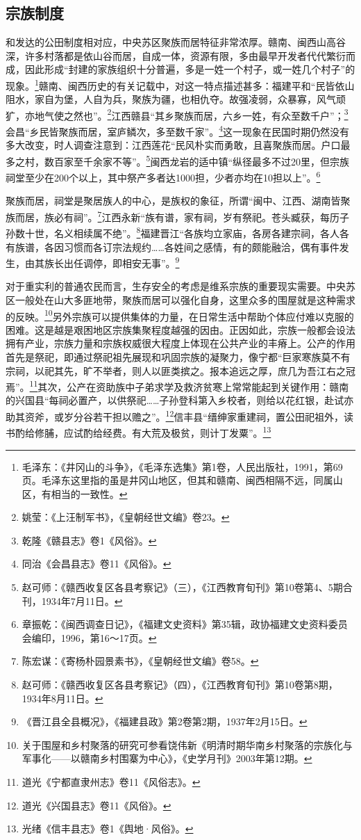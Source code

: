 \subsection{宗族制度}


和发达的公田制度相对应，中央苏区聚族而居特征非常浓厚。赣南、闽西山高谷深，许多村落都是依山谷而居，自成一体，资源有限，多由最早开发者代代繁衍而成，因此形成“封建的家族组织十分普遍，多是一姓一个村子，或一姓几个村子”的现象。\footnote{毛泽东：《井冈山的斗争》，《毛泽东选集》第1卷，人民出版社，1991，第69页。毛泽东这里指的虽是井冈山地区，但其和赣南、闽西相隔不远，同属山区，有相当的一致性。}赣南、闽西历史的有关记载中，对这一特点描述甚多：福建平和“民皆依山阻水，家自为堡，人自为兵，聚族为疆，也相仇夺。故强凌弱，众暴寡，风气顽犷，亦地气使之然也”。\footnote{姚莹：《上汪制军书》，《皇朝经世文编》卷23。}江西赣县“其乡聚族而居，六乡一姓，有众至数千户”；\footnote{乾隆《赣县志》卷1《风俗》。}会昌“乡民皆聚族而居，室庐鳞次，多至数千家”。\footnote{同治《会昌县志》卷11《风俗》。}这一现象在民国时期仍然没有多大改变，时人调查注意到：江西莲花“民风朴实而勇敢，且喜聚族而居。户口最多之村，数百家至千余家不等”。\footnote{赵可师：《赣西收复区各县考察记》（三），《江西教育旬刊》第10卷第4、5期合刊，1934年7月11日。}闽西龙岩的适中镇“纵径最多不过20里，但宗族祠堂至少在200个以上，其中祭产多者达1000担，少者亦均在10担以上”。\footnote{章振乾：《闽西调查日记》，《福建文史资料》第35辑，政协福建文史资料委员会编印，1996，第16～17页。}


聚族而居，祠堂是聚居族人的中心，是族权的象征，所谓“闽中、江西、湖南皆聚族而居，族必有祠”。\footnote{陈宏谋：《寄杨朴园景素书》，《皇朝经世文编》卷58。}江西永新“族有谱，家有祠，岁有祭祀。苍头臧获，每历子孙数十世，名义相续属不绝”。\footnote{赵可师：《赣西收复区各县考察记》（四），《江西教育旬刊》第10卷第8期，1934年8月11日。}福建晋江“各族均立家庙，各房各建宗祠，各人各有族谱，各因习惯而各订宗法规约……各姓间之感情，有的颇能融洽，偶有事件发生，由其族长出任调停，即相安无事”。\footnote{《晋江县全县概况》，《福建县政》第2卷第2期，1937年2月15日。}


对于重实利的普通农民而言，生存安全的考虑是维系宗族的重要现实需要。中央苏区一般处在山大多匪地带，聚族而居可以强化自身，这里众多的围屋就是这种需求的反映。\footnote{关于围屋和乡村聚落的研究可参看饶伟新《明清时期华南乡村聚落的宗族化与军事化——以赣南乡村围寨为中心》，《史学月刊》2003年第12期。}另外宗族可以提供集体的力量，在日常生活中帮助个体应付难以克服的困难。这是越是艰困地区宗族集聚程度越强的因由。正因如此，宗族一般都会设法拥有产业，宗族力量和宗族权威很大程度上体现在公共产业的丰瘠上。公产的作用首先是祭祀，即通过祭祀祖先展现和巩固宗族的凝聚力，像宁都“巨家寒族莫不有宗祠，以祀其先，旷不举者，则人以匪类摈之。报本追远之厚，庶几为吾江右之冠焉”。\footnote{道光《宁都直隶州志》卷11《风俗志》。}其次，公产在资助族中子弟求学及救济贫寒上常常能起到关键作用：赣南的兴国县“每祠必置产，以供祭祀……子孙登科第入乡校者，则给以花红银，赴试亦助其资斧，或岁分谷若干担以赡之”。\footnote{道光《兴国县志》卷11《风俗》。}信丰县“缙绅家重建祠，置公田祀祖外，读书酌给修脯，应试酌给经费。有大荒及极贫，则计丁发粟”。\footnote{光绪《信丰县志》卷1《舆地·风俗》。}


